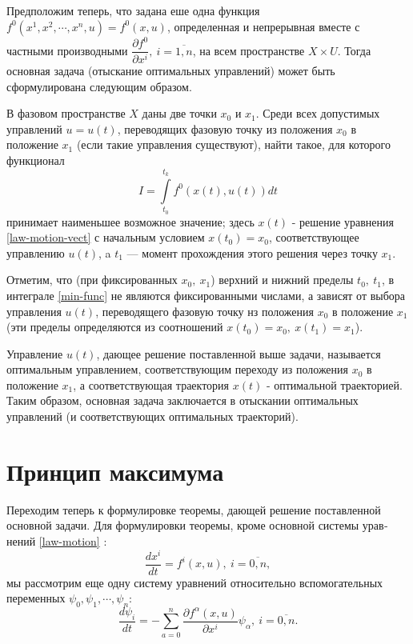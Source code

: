 \documentclass[14pt]{extreport}
\begin{document}
Предположим теперь, что задана еше одна функция $f^0(x^1,x^2,\cdots,x^n,u)=f^0(x,u)$, определенная и непрерывная вместе с частными производными $\dfrac{\partial f^0}{\partial x^i},\ i = \overline{1,n}$, на всем пространстве $X \times U$. Тогда основная задача (отыскание оптимальных управлений) может быть сформулирована следующим образом.

В фазовом пространстве $X$ даны две точки $x_0$ и $x_1$. Среди всех допустимых управлений $u=u(t)$, переводя­щих фазовую точку из положения $x_0$ в положение $x_1$ (если такие управления существуют), найти такое, для которого функционал
\begin{equation}
\label{min-func}
I=\int \limits_{t_0}^{t_k} f^0(x(t),u(t))dt
\end{equation}
принимает наименьшее возможное значение; здесь $x(t)$ - решение уравнения \eqref{law-motion-vect} с начальным условием $x(t_0)=x_0$, соответствующее управлению $u(t)$, a $t_1$ — момент прохождения этого решения через точку $x_1$.

Отметим, что (при фиксированных $x_0,\ x_1$) верхний и нижний пределы $t_0,\ t_1$, в интеграле \eqref{min-func} не являются фиксированными числами, а зависят от выбора управ­ления $u(t)$, переводящего фазовую точку нз положе­ния $x_0$ в положение $x_1$ (эти пределы определяются из соотношений $x(t_0)=x_0,\ x(t_1)=x_1$).

Управление $u(t)$, дающее решение поставленной выше задачи, называется оптимальным управлением, соответ­ствующим переходу из положения $x_0$ в положение $x_1$, а соответствующая траектория $x(t)$ - оптимальной тра­екторией. Таким образом, основная задача заключается в отыскании оптимальных управлений (и соответствую­щих оптимальных траекторий).

\section{Принцип максимума}
Переходим теперь к формулировке теоремы, дающей решение поставленной основной задачи. Для формулировки теоремы, кроме основной системы урав­нений \eqref{law-motion} \cite{roitenberg}:
\begin{equation}
\label{basic-system}
\dfrac{dx^i}{dt}=f^i(x,u),\ i=\overline{0,n},
\end{equation}
мы рассмотрим еще одну систему уравнений относительно вспомогательных переменных $\psi_0,\psi_1,\cdots,\psi_n$:
\begin{equation}
\label{linked-var}
\dfrac{d\psi_i}{dt}=-\sum\limits_{a=0}^{n}\dfrac{\partial f^{\alpha}(x,u)}{\partial x^i}\psi_{\alpha},\ i=\overline{0,n}.
\end{equation}
\end{document}
